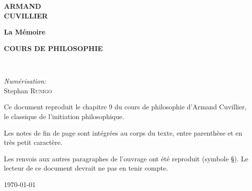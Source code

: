 \begin{titlepage}
%
~\\[1cm]

\textsc{\Large }\\[0.5cm]


\begin{center}
{\large \bfseries  ARMAND  \\
\Huge CUVILLIER \\}
\end{center}

\HRule
\begin{center}
{\Huge \bfseries La Mémoire}
\end{center}
\begin{center}
{\Large \bfseries COURS DE PHILOSOPHIE
}
\end{center}

\HRule \\[1.5cm]

\begin{center}
\end{center}

\begin{center}
\end{center}


\begin{minipage}{0.4\textwidth}
\begin{flushleft} \large
\end{flushleft}
\end{minipage}
\begin{minipage}{0.4\textwidth}
\begin{flushright} \large
\emph{Numérisation:}\\
Stephan \textsc{Runigo}
\end{flushright}
\end{minipage}

\vfill
Ce document reproduit le chapitre 9 du cours de philosophie d'Armand Cuvillier, le classique de l'initiation philosophique.

Les notes de fin de page sont intégrées au corps du texte, entre parenthèse et en très petit caractère.

Les renvois aux autres paragraphes de l'ouvrage ont été reproduit (symbole \S). Le lecteur de ce document devrait ne pas en tenir compte.
\vfill

{\large \today}

\end{titlepage}
